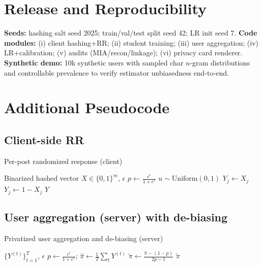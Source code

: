 \documentclass[acmsmall,natbib]{acmart}
\begin{document}
\begin{CJK*}{UTF8}{gbsn}

\section{Release and Reproducibility}
\label{app:release}
\textbf{Seeds:} hashing salt seed 2025; train/val/test split seed 42; LR init seed 7.  
\textbf{Code modules:} (i) client hashing+RR; (ii) student training; (iii) user aggregation; (iv) LR+calibration; (v) audits (MIA/recon/linkage); (vi) privacy card renderer.  
\textbf{Synthetic demo:} 10k synthetic users with sampled char $n$‑gram distributions and controllable prevalence to verify estimator unbiasedness end‑to‑end.


\section{Additional Pseudocode}
\label{app:pseudocode}

\subsection{Client-side RR}
\begin{algorithm}[h]
\caption{Per-post randomized response (client)}
\label{alg:rr}
\begin{algorithmic}[1]
\Require Binarized hashed vector $X \in \{0,1\}^m$, $\epsilon$
\State $p \gets \frac{e^\epsilon}{1+e^\epsilon}$
  \State $u \sim \text{Uniform}(0,1)$
   \State $Y_j \gets X_j$
  \Else \State $Y_j \gets 1 - X_j$
  \EndIf
\EndFor
\State \Return $Y$
\end{algorithmic}
\end{algorithm}

\subsection{User aggregation (server) with de-biasing}
\begin{algorithm}[h]
\caption{Privatized user aggregation and de-biasing (server)}
\label{alg:agg}
\begin{algorithmic}[1]
\Require $\{Y^{(t)}\}_{t=1}^{T}$, $\epsilon$
\State $p \gets \frac{e^\epsilon}{1+e^\epsilon}$; $\hat{\pi} \gets \frac{1}{T}\sum_t Y^{(t)}$
\State $\tilde{\pi} \gets \frac{\hat{\pi} - (1-p)}{2p-1}$
\State \Return $\tilde{\pi}$
\end{algorithmic}
\end{algorithm}


\end{CJK*}
\end{document}

